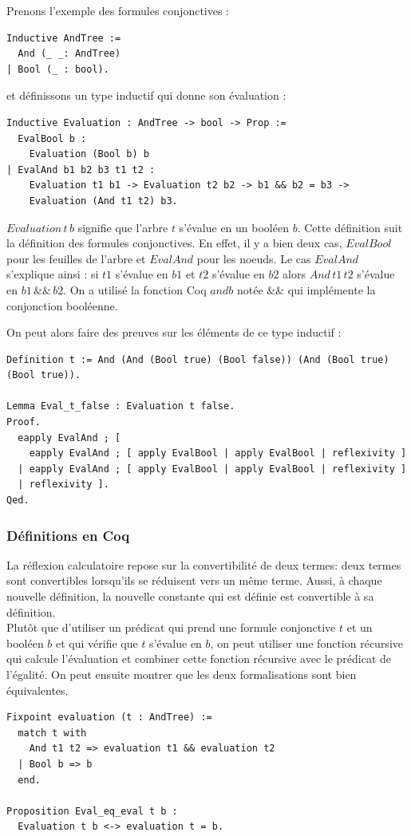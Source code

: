 \documentclass[11pt]{article}
\begin{document}
Prenons l'exemple des formules conjonctives : 

\begin{lstlisting}[frame=single]
Inductive AndTree :=
  And (_ _: AndTree)
| Bool (_ : bool).
\end{lstlisting}

et définissons un type inductif qui donne son évaluation : 

\begin{lstlisting}[frame=single]
Inductive Evaluation : AndTree -> bool -> Prop :=
  EvalBool b :
    Evaluation (Bool b) b
| EvalAnd b1 b2 b3 t1 t2 :
    Evaluation t1 b1 -> Evaluation t2 b2 -> b1 && b2 = b3 ->
    Evaluation (And t1 t2) b3.
\end{lstlisting}
$Evaluation \, t \, b$ signifie que l'arbre $t$ s'évalue en un booléen $b$. Cette définition suit la définition des formules conjonctives. En effet, il y a bien deux cas, $EvalBool$ pour les feuilles de l'arbre et $EvalAnd$ pour les noeuds. Le cas $EvalAnd$ s'explique ainsi : si $t1$ s'évalue en $b1$ et $t2$ s'évalue en $b2$ alors $And \, t1 \, t2$ s'évalue en $b1\,\&\&\,b2$.  On a utilisé la fonction Coq $andb$ notée $\&\&$ qui implémente la conjonction booléenne.

On peut alors faire des preuves sur les éléments de ce type inductif : 
\begin{lstlisting}[frame=single]
Definition t := And (And (Bool true) (Bool false)) (And (Bool true) (Bool true)).

Lemma Eval_t_false : Evaluation t false.
Proof.
  eapply EvalAnd ; [
    eapply EvalAnd ; [ apply EvalBool | apply EvalBool | reflexivity ]
  | eapply EvalAnd ; [ apply EvalBool | apply EvalBool | reflexivity ]
  | reflexivity ].
Qed.
\end{lstlisting}

\subsubsection{Définitions en Coq}

La réflexion calculatoire repose sur la convertibilité de deux termes: deux termes sont convertibles lorsqu'ils se réduisent vers un même terme. Aussi, à chaque nouvelle définition, la nouvelle constante qui est définie est convertible à sa définition. \\

Plutôt que d'utiliser un prédicat qui prend une formule conjonctive $t$ et un booléen $b$ et qui vérifie que $t$ s'évalue en $b$, on peut utiliser une fonction récursive qui calcule l'évaluation et combiner cette fonction récursive avec le prédicat de l'égalité. On peut ensuite montrer que les deux formalisations sont bien équivalentes.  
\begin{lstlisting}[frame=single]
Fixpoint evaluation (t : AndTree) :=
  match t with
    And t1 t2 => evaluation t1 && evaluation t2
  | Bool b => b
  end.
  
Proposition Eval_eq_eval t b :
  Evaluation t b <-> evaluation t = b.
  
\end{lstlisting}
\end{document}
